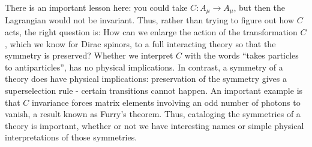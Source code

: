 \documentclass[11pt]{article}
\theoremstyle{definition}
\begin{document}
There is an important lesson here: you could take \( C : A_\mu \to A_\mu \), but then the Lagrangian would not be invariant. Thus, rather than trying to figure out how \( C \) acts, the right question is: How can we enlarge the action of the transformation \( C \), which we know for Dirac spinors, to a full interacting theory so that the symmetry is preserved? Whether we interpret \( C \) with the words ``takes particles to antiparticles'', has no physical implications. In contrast, a symmetry of a theory does have physical implications: preservation of the symmetry gives a superselection rule - certain transitions cannot happen. An important example is that \( C \) invariance forces matrix elements involving an odd number of photons to vanish, a result known as Furry's theorem. Thus, cataloging the symmetries of a theory is important, whether or not we have interesting names or simple physical interpretations of those symmetries.
\end{document}
